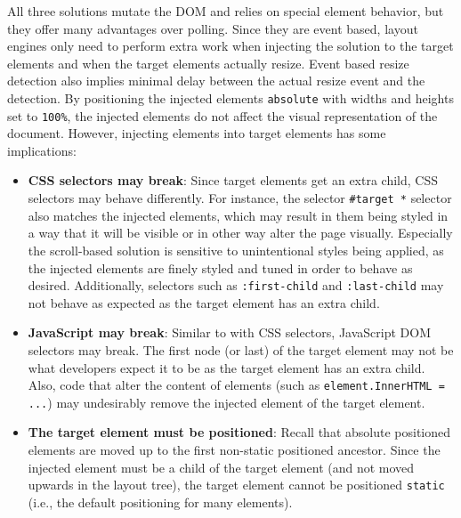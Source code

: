\documentclass[a4paper,11pt]{kth-mag}
\newcommand{\code}[1]{\texttt{#1}}
\begin{document}
        All three solutions mutate the \gls{DOM} and relies on special \gls{element} behavior, but they offer many advantages over polling.
        Since they are event based, \glspl{layout engine} only need to perform extra work when injecting the solution to the target \glspl{element} and when the target \glspl{element} actually resize.
        Event based resize detection also implies minimal delay between the actual resize event and the detection.
        By positioning the injected \glspl{element} \code{absolute} with widths and heights set to \code{100\%}, the injected \glspl{element} do not affect the visual representation of the \gls{document}.
        However, injecting \glspl{element} into target \glspl{element} has some implications:
        \begin{itemize}
          \item \textbf{\gls{CSS} selectors may break}:
            Since target \glspl{element} get an extra child, \gls{CSS} selectors may behave differently.
            For instance, the selector \code{\#target~*} selector also matches the injected \glspl{element}, which may result in them being styled in a way that it will be visible or in other way alter the page visually.
            Especially the scroll-based solution is sensitive to unintentional styles being applied, as the injected \glspl{element} are finely styled and tuned in order to behave as desired.
            Additionally, selectors such as \code{:first-child} and \code{:last-child} may not behave as expected as the target element has an extra child.
          \item \textbf{\gls{JavaScript} may break}:
            Similar to with \gls{CSS} selectors, \gls{JavaScript} \gls{DOM} selectors may break.
            The first node (or last) of the target \gls{element} may not be what developers expect it to be as the target element has an extra child.
            Also, code that alter the content of \glspl{element} (such as \code{element.InnerHTML = ...}) may undesirably remove the injected \gls{element} of the target \gls{element}.
          \item \textbf{The target \gls{element} must be positioned}:
            Recall that absolute positioned \glspl{element} are moved up to the first non-static positioned ancestor.
            Since the injected element must be a child of the target \gls{element} (and not moved upwards in the layout tree), the target \gls{element} cannot be positioned \code{static} (i.e., the default positioning for many \glspl{element}).

\end{itemize}
\end{document}
